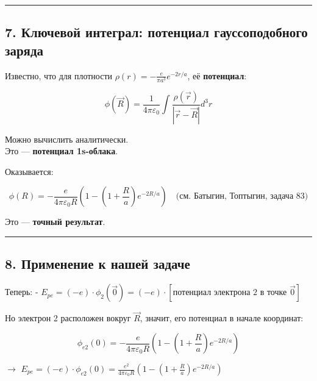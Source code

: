 \documentclass[11pt]{article}
\begin{document}
\begin{center}\rule{0.5\linewidth}{\linethickness}\end{center}

\subsection{7. Ключевой интеграл: потенциал гауссоподобного
заряда}\label{ux43aux43bux44eux447ux435ux432ux43eux439-ux438ux43dux442ux435ux433ux440ux430ux43b-ux43fux43eux442ux435ux43dux446ux438ux430ux43b-ux433ux430ux443ux441ux441ux43eux43fux43eux434ux43eux431ux43dux43eux433ux43e-ux437ux430ux440ux44fux434ux430}

Известно, что для плотности \(\rho(r) = -\frac{e}{\pi a^3} e^{-2r/a}\),
её \textbf{потенциал}:

\[
\phi(\vec{R}) = \frac{1}{4\pi\varepsilon_0} \int \frac{ \rho(\vec{r}) }{ |\vec{r} - \vec{R}| } d^3r
\]

Можно вычислить аналитически.\\
Это --- \textbf{потенциал 1s-облака}.

Оказывается:

\[
\phi(R) = -\frac{e}{4\pi\varepsilon_0 R} \left( 1 - \left(1 + \frac{R}{a}\right) e^{-2R/a} \right)
\quad \text{(см. Батыгин, Топтыгин, задача 83)}
\]

Это --- \textbf{точный результат}.

\begin{center}\rule{0.5\linewidth}{\linethickness}\end{center}

\subsection{8. Применение к нашей
задаче}\label{ux43fux440ux438ux43cux435ux43dux435ux43dux438ux435-ux43a-ux43dux430ux448ux435ux439-ux437ux430ux434ux430ux447ux435}

Теперь: -
\(E_{pe} = (-e) \cdot \phi_2(\vec{0}) = (-e) \cdot \left[ \text{потенциал электрона 2 в точке } \vec{0} \right]\)

Но электрон 2 расположен вокруг \(\vec{R}\), значит, его потенциал в
начале координат:

\[
\phi_{e2}(0) = -\frac{e}{4\pi\varepsilon_0 R} \left( 1 - \left(1 + \frac{R}{a}\right) e^{-2R/a} \right)
\]

$\rightarrow$
\(E_{pe} = (-e) \cdot \phi_{e2}(0) = \frac{e^2}{4\pi\varepsilon_0 R} \left( 1 - \left(1 + \frac{R}{a}\right) e^{-2R/a} \right)\)
\end{document}
